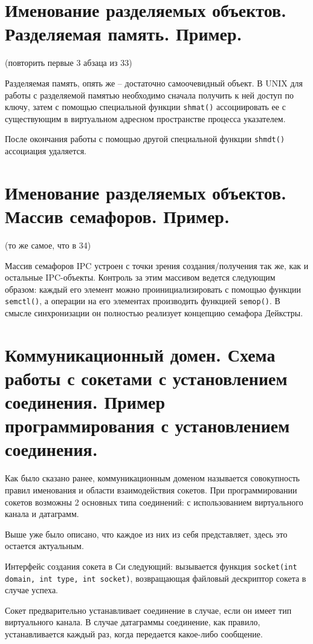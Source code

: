 \documentclass[a4paper,12pt,titlepage,finall]{article}
\begin{document}
\section{Именование разделяемых объектов.
Разделяемая память. Пример.}
(повторить первые 3 абзаца из 33)

Разделяемая память, опять же -- достаточно самоочевидный объект. В UNIX для работы с разделяемой памятью необходимо сначала получить к ней доступ по ключу, затем с помощью специальной функции \texttt{shmat()} ассоциировать ее с существующим в виртуальном адресном пространстве процесса указателем.

После окончания работы с помощью другой специальной функции \texttt{shmdt()} ассоциация удаляется.

\section{Именование разделяемых объектов. Массив
семафоров. Пример.}
(то же самое, что в 34)

Массив семафоров IPC устроен с точки зрения создания/получения так же, как и остальные IPC-объекты. Контроль за этим массивом ведется следующим образом: каждый его элемент можно проинициализировать с помощью функции \texttt{semctl()}, а операции на его элементах производить функцией \texttt{semop()}. В смысле синхронизации он полностью реализует концепцию семафора Дейкстры.

\section{Коммуникационный домен. Схема работы с сокетами с установлением соединения.
Пример программирования с установлением соединения.}
Как было сказано ранее, коммуникационным доменом называется совокупность правил именования и области взаимодействия сокетов. При программировании сокетов возможны 2 основных типа соединений: с использованием виртуального канала и датаграмм.

Выше уже было описано, что каждое из них из себя представляет, здесь это остается актуальным.

Интерфейс создания сокета в Си следующий: вызывается функция \texttt{socket(int domain, int type, int socket)}, возвращающая файловый дескриптор сокета в случае успеха.

Сокет предварительно устанавливает соединение в случае, если он имеет тип виртуального канала. В случае датаграммы соединение, как правило, устанавливается каждый раз, когда передается какое-либо сообщение.
\end{document}

